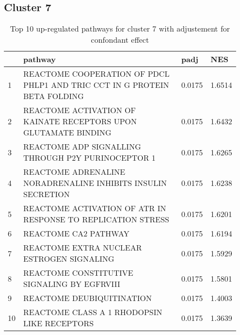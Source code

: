 \documentclass{article}
\begin{document}
\subsection{Cluster 7 }
\begin{table}[H]
\centering
\begin{tabular}{p{0.05\linewidth}p{0.7\linewidth}p{0.1\linewidth}p{0.1\linewidth}}
  \hline
 & pathway & padj & NES \\ 
  \hline
1 & REACTOME COOPERATION OF PDCL PHLP1 AND TRIC CCT IN G PROTEIN BETA FOLDING & 0.0175 & 1.6514 \\ 
  2 & REACTOME ACTIVATION OF KAINATE RECEPTORS UPON GLUTAMATE BINDING & 0.0175 & 1.6432 \\ 
  3 & REACTOME ADP SIGNALLING THROUGH P2Y PURINOCEPTOR 1 & 0.0175 & 1.6265 \\ 
  4 & REACTOME ADRENALINE NORADRENALINE INHIBITS INSULIN SECRETION & 0.0175 & 1.6238 \\ 
  5 & REACTOME ACTIVATION OF ATR IN RESPONSE TO REPLICATION STRESS & 0.0175 & 1.6201 \\ 
  6 & REACTOME CA2 PATHWAY & 0.0175 & 1.6194 \\ 
  7 & REACTOME EXTRA NUCLEAR ESTROGEN SIGNALING & 0.0175 & 1.5929 \\ 
  8 & REACTOME CONSTITUTIVE SIGNALING BY EGFRVIII & 0.0175 & 1.5801 \\ 
  9 & REACTOME DEUBIQUITINATION & 0.0175 & 1.4003 \\ 
  10 & REACTOME CLASS A 1 RHODOPSIN LIKE RECEPTORS & 0.0175 & 1.3639 \\ 
   \hline
\end{tabular}
\caption{Top 10 up-regulated pathways for cluster 7 with adjustement for confondant effect} 
\label{tab:q3_2_conf_7}
\end{table}
\end{document}
